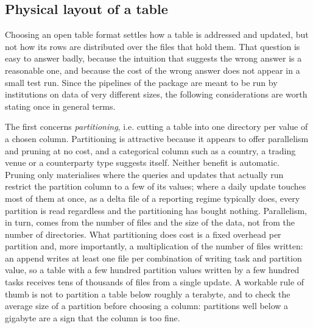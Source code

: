 \documentclass[a4paper, 11pt]{report}
\begin{document}
\subsection{Physical layout of a table\label{sec:intro-data-layout}}

Choosing an open table format settles how a table is addressed and updated, but not how its rows are distributed over the files that hold them. That question is easy to answer badly, because the intuition that suggests the wrong answer is a reasonable one, and because the cost of the wrong answer does not appear in a small test run. Since the pipelines of the package are meant to be run by institutions on data of very different sizes, the following considerations are worth stating once in general terms.

The first concerns \emph{partitioning}, i.e. cutting a table into one directory per value of a chosen column. Partitioning is attractive because it appears to offer parallelism and pruning at no cost, and a categorical column such as a country, a trading venue or a counterparty type suggests itself. Neither benefit is automatic. Pruning only materialises where the queries and updates that actually run restrict the partition column to a few of its values; where a daily update touches most of them at once, as a delta file of a reporting regime typically does, every partition is read regardless and the partitioning has bought nothing. Parallelism, in turn, comes from the number of files and the size of the data, not from the number of directories. What partitioning does cost is a fixed overhead per partition and, more importantly, a multiplication of the number of files written: an append writes at least one file per combination of writing task and partition value, so a table with a few hundred partition values written by a few hundred tasks receives tens of thousands of files from a single update. A workable rule of thumb is not to partition a table below roughly a terabyte, and to check the average size of a partition before choosing a column: partitions well below a gigabyte are a sign that the column is too fine.
\end{document}
